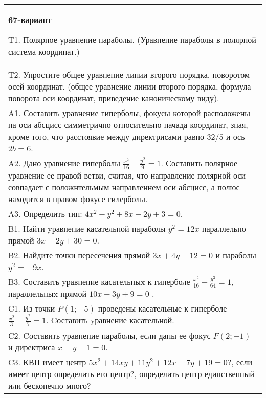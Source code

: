 \documentclass{article}
\begin{document}
\begin{tabular}{m{17cm}}
\textbf{67-вариант}
\newline

T1. Полярное уравнение параболы. (Уравнение параболы в полярной система координат.)\\

T2. Упростите общее уравнение линии второго порядка, поворотом осей координат. (общее уравнение линии второго порядка, формула поворота оси координат, приведение каноническому виду).\\

A1. Составить уравнение гиперболы, фокусы которой расположены на оси абсцисс симметрично относительно начада координат, зная, кроме того, что расстоявие между директрисами равно $32/5$ и ось $2b=6$.\\

A2. Дано уравнение гиперболы $\frac{x^{2}}{16}-\frac{y^{2}}{9}=1$. Составить полярное уравнение ее правой ветви, считая, что направление полярной оси совпадает с положнтельмым направленнем оси абсцисс, а полюс находится в правом фокусе гилерболы.\\

A3. Определить тип: $4x^{2}-y^{2}+8x-2y+3=0$.\\

B1. Найти yравнение касательной параболы $y^{2} = 12x$ параллельно прямой $3x - 2y + 30 = 0$.  \\

B2. Найдите точки пересечения прямой $3x + 4y - 12 = 0$ и параболы $y^{2} = - 9x$.  \\

B3. Составить yравнение касательныx к гиперболе $\frac{x^{2}}{16} - \frac{y^{2}}{64} = 1$, параллельныx прямой $10x - 3y + 9 = 0$ .  \\

C1. Из точки $P(1;-5)$ проведены касательные к гиперболе $\frac{x^{2}}{3}-\frac{y^{2}}{5}=1$. Cоставить yравнение касательной.\\

C2. Cоставить yравнение параболы, если даны ее фокyс $F(2;-1)$ и директриса $x-y-1=0$.  \\

C3. КВП имеет центр $5x^{2}+14xy+11y^{2}+12x-7y+19=0$?, если имеет центр определить его центр?, определить центр единственный или бесконечно много?  \\

\end{tabular}
\vspace{1cm}
\end{document}

